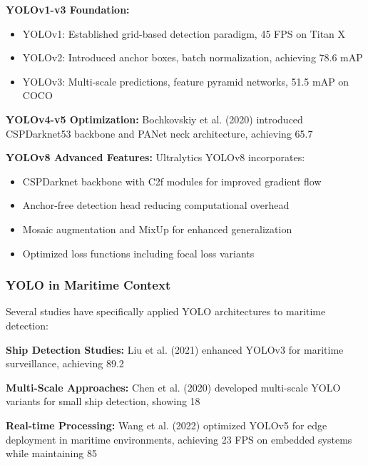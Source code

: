 \documentclass[a4paper,11pt]{article}
\begin{document}
\textbf{YOLOv1-v3 Foundation:}
\begin{itemize}
    \item YOLOv1: Established grid-based detection paradigm, 45 FPS on Titan X
    \item YOLOv2: Introduced anchor boxes, batch normalization, achieving 78.6 mAP
    \item YOLOv3: Multi-scale predictions, feature pyramid networks, 51.5 mAP on COCO
\end{itemize}

\textbf{YOLOv4-v5 Optimization:}
Bochkovskiy et al. (2020) \cite{bochkovskiy2020yolov4} introduced CSPDarknet53 backbone and PANet neck architecture, achieving 65.7%

\textbf{YOLOv8 Advanced Features:}
Ultralytics YOLOv8 \cite{yolov8} incorporates:
\begin{itemize}
    \item CSPDarknet backbone with C2f modules for improved gradient flow
    \item Anchor-free detection head reducing computational overhead
    \item Mosaic augmentation and MixUp for enhanced generalization
    \item Optimized loss functions including focal loss variants
\end{itemize}

\subsubsection{YOLO in Maritime Context}
Several studies have specifically applied YOLO architectures to maritime detection:

\textbf{Ship Detection Studies:} Liu et al. (2021) \cite{liu2021enhanced} enhanced YOLOv3 for maritime surveillance, achieving 89.2%

\textbf{Multi-Scale Approaches:} Chen et al. (2020) \cite{chen2020improved} developed multi-scale YOLO variants for small ship detection, showing 18%

\textbf{Real-time Processing:} Wang et al. (2022) \cite{wang2022realtime} optimized YOLOv5 for edge deployment in maritime environments, achieving 23 FPS on embedded systems while maintaining 85%
\end{document}
